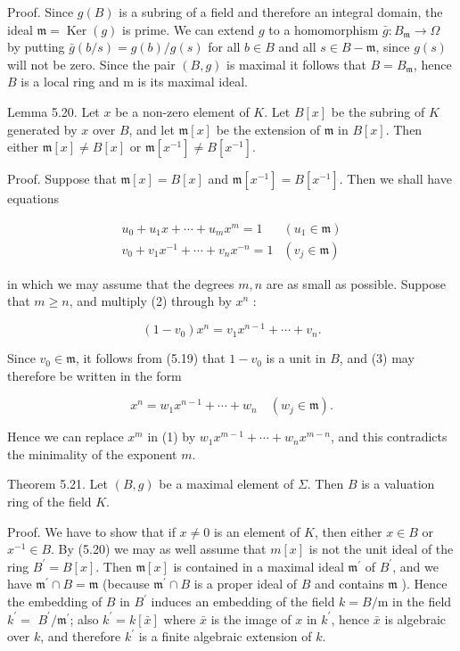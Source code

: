 \documentclass{standalone}
\theoremstyle{definition}
\theoremstyle{remark}
\begin{document}
Proof. Since $g(B)$ is a subring of a field and therefore an integral domain, the ideal $\mathfrak{m}=\operatorname{Ker}(g)$ is prime. We can extend $g$ to a homomorphism $\bar{g}: B_{\mathfrak{m}} \rightarrow \Omega$ by putting $\bar{g}(b / s)=g(b) / g(s)$ for all $b \in B$ and all $s \in B-\mathfrak{m}$, since $g(s)$ will not be zero. Since the pair $(B, g)$ is maximal it follows that $B=B_{\mathfrak{m}}$, hence $B$ is a local ring and $\mathrm{m}$ is its maximal ideal.

Lemma 5.20. Let $x$ be a non-zero element of $K$. Let $B[x]$ be the subring of $K$ generated by $x$ over $B$, and let $\mathfrak{m}[x]$ be the extension of $\mathfrak{m}$ in $B[x]$. Then either $\mathfrak{m}[x] \neq B[x]$ or $\mathfrak{m}\left[x^{-1}\right] \neq B\left[x^{-1}\right]$.

Proof. Suppose that $\mathfrak{m}[x]=B[x]$ and $\mathfrak{m}\left[x^{-1}\right]=B\left[x^{-1}\right]$. Then we shall have equations

\[
\begin{array}{cc}
u_{0}+u_{1} x+\cdots+u_{m} x^{m}=1 & \left(u_{1} \in \mathfrak{m}\right) \\
v_{0}+v_{1} x^{-1}+\cdots+v_{n} x^{-n}=1 & \left(v_{j} \in \mathfrak{m}\right)
\end{array}
\]

in which we may assume that the degrees $m, n$ are as small as possible. Suppose that $m \geqslant n$, and multiply (2) through by $x^{n}$ :

\[
\left(1-v_{0}\right) x^{n}=v_{1} x^{n-1}+\cdots+v_{n} .
\]

Since $v_{0} \in \mathfrak{m}$, it follows from (5.19) that $1-v_{0}$ is a unit in $B$, and (3) may therefore be written in the form

\[
x^{n}=w_{1} x^{n-1}+\cdots+w_{n} \quad\left(w_{j} \in \mathfrak{m}\right) .
\]

Hence we can replace $x^{m}$ in (1) by $w_{1} x^{m-1}+\cdots+w_{n} x^{m-n}$, and this contradicts the minimality of the exponent $m$.

Theorem 5.21. Let $(B, g)$ be a maximal element of $\Sigma$. Then $B$ is a valuation ring of the field $K$.

Proof. We have to show that if $x \neq 0$ is an element of $K$, then either $x \in B$ or $x^{-1} \in B$. By (5.20) we may as well assume that $m[x]$ is not the unit ideal of the ring $B^{\prime}=B[x]$. Then $\mathfrak{m}[x]$ is contained in a maximal ideal $\mathfrak{m}^{\prime}$ of $B^{\prime}$, and we have $\mathfrak{m}^{\prime} \cap B=\mathfrak{m}$ (because $\mathfrak{m}^{\prime} \cap B$ is a proper ideal of $B$ and contains $\mathfrak{m}$ ). Hence the embedding of $B$ in $B^{\prime}$ induces an embedding of the field $k=B / \mathrm{m}$ in the field $k^{\prime}=$ $B^{\prime} / \mathfrak{m}^{\prime}$; also $k^{\prime}=k[\bar{x}]$ where $\bar{x}$ is the image of $x$ in $k^{\prime}$, hence $\bar{x}$ is algebraic over $k$, and therefore $k^{\prime}$ is a finite algebraic extension of $k$.
\end{document}
